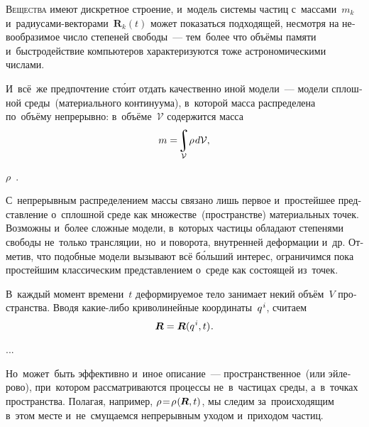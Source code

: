 \begin{otherlanguage}{russian}

\lettrine[lines=2, findent=2pt, nindent=0pt]{В}{ещества} имеют дискретное строение, и~модель системы частиц с~массами~${m_k}$ и~радиусами\hbox{-}векторами~${\bm{R}_k (t)}$ может показаться подходящей, несмотря на невообразимое число степеней свободы~--- тем~более что объёмы памяти и~быстродействие компьютеров характеризуются тоже астрономическими числами.

И~всё~же предпочтение ст\'{о}ит отдать качественно иной модели~--- модели сплошной среды~(материального континуума), в~которой масса распределена по~объёму непрерывно: в~объёме~$\mathcal{V}$ содержится масса
\vspace{-0.25em}\begin{equation}
m =\! \integral\displaylimits_{\mathcal{V}} \! \rho \hspace{0.2ex} d\mathcal{V},
\end{equation}

\vspace{-0.5em}\noindent {} $\rho$~.

С~непрерывным распределением массы связано лишь первое и~простейшее представление о~сплошной среде как множестве~(пространстве) материальных точек. Возможны и~более сложные модели, в~которых частицы обладают степенями свободы не~только трансляции, но~и поворота, внутренней деформации и~др. Отметив, что подобные модели вызывают всё б\'{о}льший интерес, ограничимся пока простейшим классическим представлением о~среде как состоящей из~точек.

В~каждый момент времени~$t$ деформируемое тело занимает некий объём~$V$ пространства. Вводя какие\hbox{-}либо криволинейные координаты~${q^{\hspace{.1ex}i}}$, считаем
\begin{equation}
\bm{R} = \bm{R}(q^{\hspace{.1ex}i}, t) \hspace{.1ex}.
\end{equation}

...


Но~может~быть эффективно и~иное описание~--- пространственное~(или эйлерово), при~котором рассматриваются процессы не~в~частицах среды, а~в~точках пространства. Полагая, например, ${\rho \!=\! \rho \hspace{.16ex} (\hspace{-0.1ex}\bm{R}, t)}$, мы следим за~происходящим в~этом месте и~не~смущаемся непрерывным уходом и~приходом частиц.

\end{otherlanguage}

